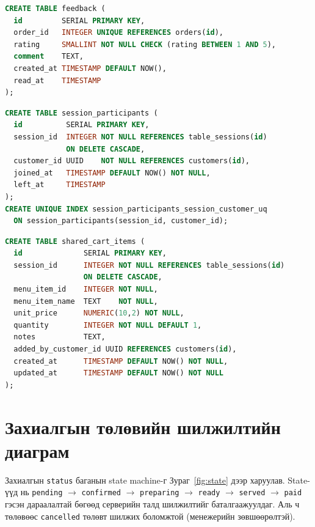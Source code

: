 \begin{lstlisting}[language=SQL, caption={feedback хүснэгтийн бүтэц}, label={lst:fb}]
CREATE TABLE feedback (
  id         SERIAL PRIMARY KEY,
  order_id   INTEGER UNIQUE REFERENCES orders(id),
  rating     SMALLINT NOT NULL CHECK (rating BETWEEN 1 AND 5),
  comment    TEXT,
  created_at TIMESTAMP DEFAULT NOW(),
  read_at    TIMESTAMP
);
\end{lstlisting}

\begin{lstlisting}[language=SQL, caption={session\_participants хүснэгтийн бүтэц (нэг ширээнд олон төхөөрөмж)}, label={lst:participants}]
CREATE TABLE session_participants (
  id          SERIAL PRIMARY KEY,
  session_id  INTEGER NOT NULL REFERENCES table_sessions(id)
              ON DELETE CASCADE,
  customer_id UUID    NOT NULL REFERENCES customers(id),
  joined_at   TIMESTAMP DEFAULT NOW() NOT NULL,
  left_at     TIMESTAMP
);
CREATE UNIQUE INDEX session_participants_session_customer_uq
  ON session_participants(session_id, customer_id);
\end{lstlisting}

\begin{lstlisting}[language=SQL, caption={shared\_cart\_items хүснэгтийн бүтэц (server-д хадгалагдсан хамтын сагс)}, label={lst:cart}]
CREATE TABLE shared_cart_items (
  id              SERIAL PRIMARY KEY,
  session_id      INTEGER NOT NULL REFERENCES table_sessions(id)
                  ON DELETE CASCADE,
  menu_item_id    INTEGER NOT NULL,
  menu_item_name  TEXT    NOT NULL,
  unit_price      NUMERIC(10,2) NOT NULL,
  quantity        INTEGER NOT NULL DEFAULT 1,
  notes           TEXT,
  added_by_customer_id UUID REFERENCES customers(id),
  created_at      TIMESTAMP DEFAULT NOW() NOT NULL,
  updated_at      TIMESTAMP DEFAULT NOW() NOT NULL
);
\end{lstlisting}

\section{Захиалгын төлөвийн шилжилтийн диаграм}

Захиалгын \texttt{status} баганын state machine-г Зураг~\ref{fig:state} дээр
харуулав. State-үүд нь \texttt{pending} $\to$ \texttt{confirmed} $\to$
\texttt{preparing} $\to$ \texttt{ready} $\to$ \texttt{served} $\to$ \texttt{paid}
гэсэн дараалалтай бөгөөд серверийн талд шилжилтийг баталгаажуулдаг. Аль ч
төлөвөөс \texttt{cancelled} төлөвт шилжих боломжтой (менежерийн зөвшөөрөлтэй).

